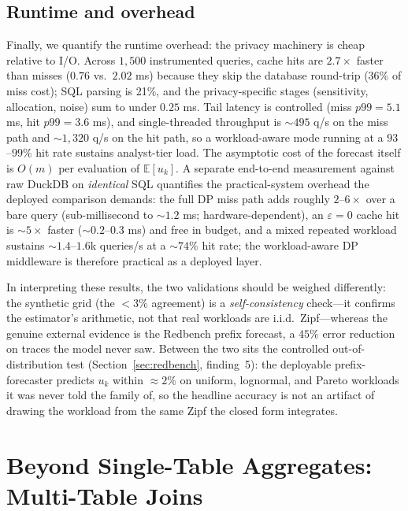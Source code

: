 \documentclass[sigconf,nonacm]{acmart}
\newcommand{\eps}{\varepsilon}
\newcommand{\E}{\mathbb{E}}
\begin{document}
\subsection{Runtime and overhead}

Finally, we quantify the runtime overhead: the privacy machinery is cheap relative to I/O. Across $1{,}500$ instrumented queries, cache hits are $2.7\times$ faster than misses ($0.76$ vs.\ $2.02$ ms) because they skip the database round-trip (36\% of miss cost); SQL parsing is 21\%, and the privacy-specific stages (sensitivity, allocation, noise) sum to under $0.25$ ms. Tail latency is controlled (miss $p99{=}5.1$ ms, hit $p99{=}3.6$ ms), and single-threaded throughput is $\sim$$495$ q/s on the miss path and $\sim$$1{,}320$ q/s on the hit path, so a workload-aware mode running at a $93$--$99\%$ hit rate sustains analyst-tier load. The asymptotic cost of the forecast itself is $O(m)$ per evaluation of $\E[u_k]$. A separate end-to-end measurement against raw DuckDB on \emph{identical} SQL quantifies the practical-system overhead the deployed comparison demands: the full DP miss path adds roughly $2$--$6\times$ over a bare query (sub-millisecond to ${\sim}1.2$ ms; hardware-dependent), an $\eps{=}0$ cache hit is ${\sim}5\times$ faster (${\sim}0.2$--$0.3$ ms) and free in budget, and a mixed repeated workload sustains ${\sim}1.4$--$1.6$k queries/s at a ${\sim}74\%$ hit rate; the workload-aware DP middleware is therefore practical as a deployed layer.

In interpreting these results, the two validations should be weighed differently: the synthetic grid (the $<3\%$ agreement) is a \emph{self-consistency} check---it confirms the estimator's arithmetic, not that real workloads are i.i.d.\ Zipf---whereas the genuine external evidence is the Redbench prefix forecast, a $45\%$ error reduction on traces the model never saw. Between the two sits the controlled out-of-distribution test (Section~\ref{sec:redbench}, finding~5): the deployable prefix-forecaster predicts $u_k$ within $\approx2\%$ on uniform, lognormal, and Pareto workloads it was never told the family of, so the headline accuracy is not an artifact of drawing the workload from the same Zipf the closed form integrates.

\section{Beyond Single-Table Aggregates: Multi-Table Joins}
\label{sec:joins}
\end{document}
